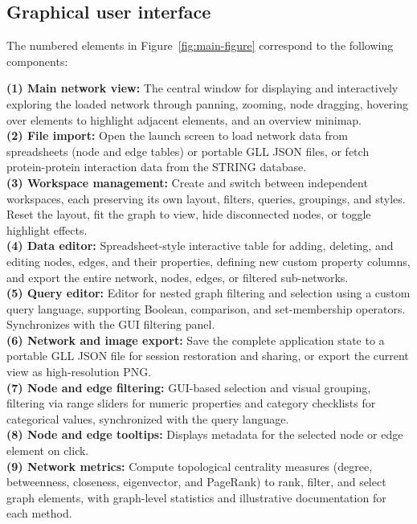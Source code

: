 \subsection{Graphical user interface}
The numbered elements in Figure~\ref{fig:main-figure} correspond to the following components:

\noindent
\textbf{(1) Main network view:} The central window for displaying and interactively exploring the loaded network through panning, zooming, node dragging, hovering over elements to highlight adjacent elements, and an overview minimap. \\
\textbf{(2) File import:} Open the launch screen to load network data from spreadsheets (node and edge tables) or portable GLL JSON files, or fetch protein-protein interaction data from the STRING database. \\
\textbf{(3) Workspace management:} Create and switch between independent workspaces, each preserving its own layout, filters, queries, groupings, and styles. Reset the layout, fit the graph to view, hide disconnected nodes, or toggle highlight effects. \\
\textbf{(4) Data editor:} Spreadsheet-style interactive table for adding, deleting, and editing nodes, edges, and their properties, defining new custom property columns, and export the entire network, nodes, edges, or filtered sub-networks. \\
\textbf{(5) Query editor:} Editor for nested graph filtering and selection using a custom query language, supporting Boolean, comparison, and set-membership operators. Synchronizes with the GUI filtering panel. \\
\textbf{(6) Network and image export:} Save the complete application state to a portable GLL JSON file for session restoration and sharing, or export the current view as high-resolution PNG. \\
\textbf{(7) Node and edge filtering:} GUI-based selection and visual grouping, filtering via range sliders for numeric properties and category checklists for categorical values, synchronized with the query language. \\
\textbf{(8) Node and edge tooltips:} Displays metadata for the selected node or edge element on click. \\
\textbf{(9) Network metrics:} Compute topological centrality measures (degree, betweenness, closeness, eigenvector, and PageRank) to rank, filter, and select graph elements, with graph-level statistics and illustrative documentation for each method. \\
